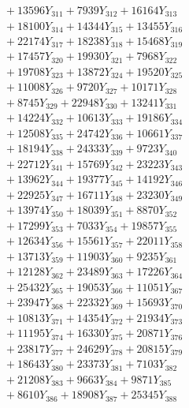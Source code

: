 \documentclass[a4paper,10pt]{article}
\begin{document}
{\begin{align}
&\;  + 13596 Y_{311} + 7939 Y_{312} + 16164 Y_{313} \\[0.3ex]
&\;  + 18100 Y_{314} + 14344 Y_{315} + 13455 Y_{316} \\[0.3ex]
&\;  + 22174 Y_{317} + 18238 Y_{318} + 15468 Y_{319} \\[0.3ex]
&\;  + 17457 Y_{320} + 19930 Y_{321} + 7968 Y_{322} \\[0.3ex]
&\;  + 19708 Y_{323} + 13872 Y_{324} + 19520 Y_{325} \\[0.3ex]
&\;  + 11008 Y_{326} + 9720 Y_{327} + 10171 Y_{328} \\[0.5ex]\allowbreak
&\;  + 8745 Y_{329} + 22948 Y_{330} + 13241 Y_{331} \\[0.3ex]
&\;  + 14224 Y_{332} + 10613 Y_{333} + 19186 Y_{334} \\[0.3ex]
&\;  + 12508 Y_{335} + 24742 Y_{336} + 10661 Y_{337} \\[0.3ex]
&\;  + 18194 Y_{338} + 24333 Y_{339} + 9723 Y_{340} \\[0.3ex]
&\;  + 22712 Y_{341} + 15769 Y_{342} + 23223 Y_{343} \\[0.3ex]
&\;  + 13962 Y_{344} + 19377 Y_{345} + 14192 Y_{346} \\[0.3ex]
&\;  + 22925 Y_{347} + 16711 Y_{348} + 23230 Y_{349} \\[0.3ex]
&\;  + 13974 Y_{350} + 18039 Y_{351} + 8870 Y_{352} \\[0.3ex]
&\;  + 17299 Y_{353} + 7033 Y_{354} + 19857 Y_{355} \\[0.3ex]
&\;  + 12634 Y_{356} + 15561 Y_{357} + 22011 Y_{358} \\[0.5ex]\allowbreak
&\;  + 13713 Y_{359} + 11903 Y_{360} + 9235 Y_{361} \\[0.3ex]
&\;  + 12128 Y_{362} + 23489 Y_{363} + 17226 Y_{364} \\[0.3ex]
&\;  + 25432 Y_{365} + 19053 Y_{366} + 11051 Y_{367} \\[0.3ex]
&\;  + 23947 Y_{368} + 22332 Y_{369} + 15693 Y_{370} \\[0.3ex]
&\;  + 10813 Y_{371} + 14354 Y_{372} + 21934 Y_{373} \\[0.3ex]
&\;  + 11195 Y_{374} + 16330 Y_{375} + 20871 Y_{376} \\[0.3ex]
&\;  + 23817 Y_{377} + 24629 Y_{378} + 20815 Y_{379} \\[0.3ex]
&\;  + 18643 Y_{380} + 23373 Y_{381} + 7103 Y_{382} \\[0.3ex]
&\;  + 21208 Y_{383} + 9663 Y_{384} + 9871 Y_{385} \\[0.3ex]
&\;  + 8610 Y_{386} + 18908 Y_{387} + 25345 Y_{388} \\[0.5ex]\allowbreak

\end{align}}
\end{document}

